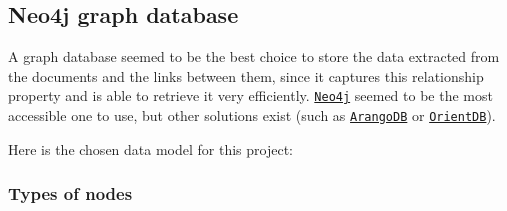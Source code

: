 \pagebreak
\subsection{Neo4j graph database} \label{ssec:neo4j-graph-database}

A graph database seemed to be the best choice to store the data extracted from the documents and the links between them, since it captures this relationship property and is able to retrieve it very efficiently. \href{https://neo4j.com/}{\texttt{Neo4j}} seemed to be the most accessible one to use, but other solutions exist (such as \href{https://www.arangodb.com/}{\texttt{ArangoDB}} or \href{https://orientdb.org/}{\texttt{OrientDB}}).

Here is the chosen data model for this project:

\subsubsection{Types of nodes} \label{sssec:types-of-nodes}

